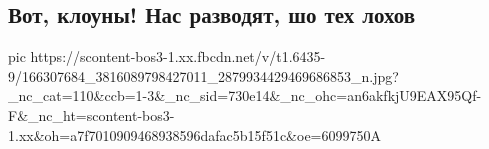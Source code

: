  
 
 
 
 
\subsection{Вот, клоуны!  Нас разводят, шо тех лохов}

\ifcmt
  pic https://scontent-bos3-1.xx.fbcdn.net/v/t1.6435-9/166307684_3816089798427011_2879934429469686853_n.jpg?_nc_cat=110&ccb=1-3&_nc_sid=730e14&_nc_ohc=an6akfkjU9EAX95Qf-F&_nc_ht=scontent-bos3-1.xx&oh=a7f7010909468938596dafac5b15f51c&oe=6099750A
\fi

